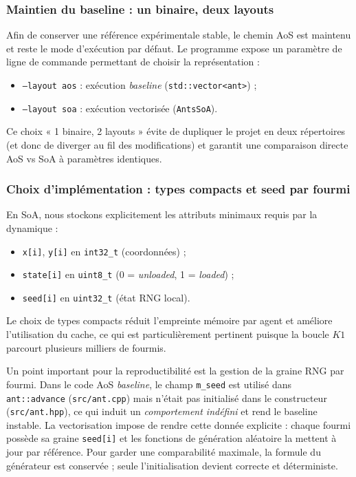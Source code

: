 \subsubsection{Maintien du baseline : un binaire, deux layouts}

Afin de conserver une référence expérimentale stable, le chemin AoS est maintenu et reste le mode d'exécution
par défaut. Le programme expose un paramètre de ligne de commande permettant de choisir la représentation :
\begin{itemize}[leftmargin=*]
    \item \texttt{--layout aos} : exécution \emph{baseline} (\texttt{std::vector<ant>}) ;
    \item \texttt{--layout soa} : exécution vectorisée (\texttt{AntsSoA}).
\end{itemize}
Ce choix « 1 binaire, 2 layouts » évite de dupliquer le projet en deux répertoires (et donc de diverger au
fil des modifications) et garantit une comparaison directe AoS vs SoA à paramètres identiques.

\subsubsection{Choix d'implémentation : types compacts et seed par fourmi}

En SoA, nous stockons explicitement les attributs minimaux requis par la dynamique :
\begin{itemize}[leftmargin=*]
    \item \texttt{x[i]}, \texttt{y[i]} en \texttt{int32\_t} (coordonnées) ;
    \item \texttt{state[i]} en \texttt{uint8\_t} (0 = \textit{unloaded}, 1 = \textit{loaded}) ;
    \item \texttt{seed[i]} en \texttt{uint32\_t} (état RNG local).
\end{itemize}
Le choix de types compacts réduit l'empreinte mémoire par agent et améliore l'utilisation du cache, ce qui est
particulièrement pertinent puisque la boucle $K1$ parcourt plusieurs milliers de fourmis.

Un point important pour la reproductibilité est la gestion de la graine RNG par fourmi. Dans le code AoS
\emph{baseline}, le champ \texttt{m\_seed} est utilisé dans \texttt{ant::advance} (\texttt{src/ant.cpp}) mais
n'était pas initialisé dans le constructeur (\texttt{src/ant.hpp}), ce qui induit un \emph{comportement indéfini}
et rend le baseline instable. La vectorisation impose de rendre cette donnée explicite : chaque fourmi possède
sa graine \texttt{seed[i]} et les fonctions de génération aléatoire la mettent à jour par référence. Pour garder
une comparabilité maximale, la formule du générateur est conservée ; seule l'initialisation devient correcte et
déterministe.


